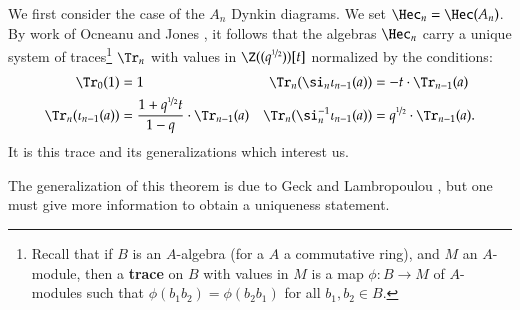 \documentclass[12pt]{amsart}
\def\to{\rightarrow}
\newtheorem{prop}[thm]{Proposition}
\theoremstyle{remark}
\begin{document}
We first consider the case of the $A_n$ Dynkin diagrams.  We set
$\Hec_n = \Hec(A_n)$.
By work of Ocneanu and Jones \cite{Jon87}, it follows that
  the algebras $\Hec_n$ carry a unique system of traces\footnote{
Recall that if $B$ is an $A$-algebra (for a $A$ a commutative ring), and $M$ an $A$-module, then a
{\bf trace} on $B$ with values in $M$ is a map $\phi:B\to M$ of $A$-modules
such that $\phi(b_1b_2)=\phi(b_2b_1)$ for all $b_1, b_2 \in B$.}
$\Tr_n$ with values in $\Z((q^{\nicefrac{1}{2}}))[t]$
  normalized by the conditions:
  \begin{align*}
    \Tr_0(1) & = 1& \Tr_n(\si_{n}\iota_{n-1}(a))&= -t \cdot \Tr_{n-1}(a)\\ %
    \Tr_{n}(\iota_{n-1}(a))&=\frac{1+q^{\nicefrac 12}t}{1-q}\cdot
    \Tr_{n-1}(a)&\Tr_n(\si_{n}^{-1}\iota_{n-1}(a))&= q^{\nicefrac
      12} \cdot \Tr_{n-1}(a).
  \end{align*}
It is this trace and its generalizations which interest us.\medskip

The generalization of this theorem is due to Geck and Lambropoulou
\cite{GL}, but one must give more information to obtain a uniqueness
statement.
\end{document}
